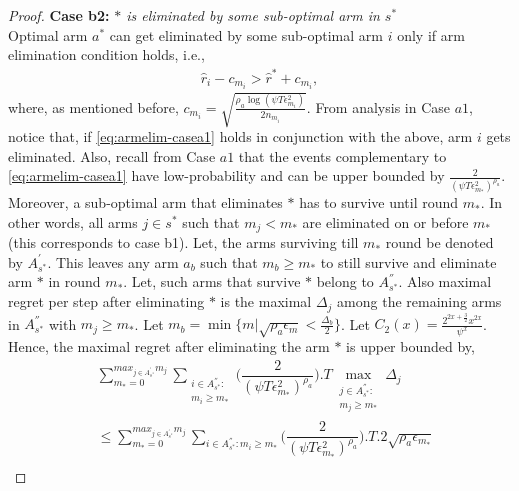 \begin{proof}
\textbf{Case b2:} \textit{${*}$ is eliminated by some sub-optimal arm in $s^*$} \\
Optimal arm $a^*$ can get eliminated by some sub-optimal arm $i$ only if arm elimination condition holds, i.e., 
\begin{align*}
\hat r_{i} - c_{m_{i}} > \hat{r}^{*}+ c_{m_{i}},
\end{align*}
where, as mentioned before, $c_{m_{i}}=\sqrt{\frac{\rho_{a}\log (\psi T\epsilon_{m_{i}}^{2})}{2 n_{m_{i}}}}$.
From analysis in Case $a1$, notice that, if \eqref{eq:armelim-casea1} holds in conjunction with the above, arm $i$ gets eliminated. Also, recall from Case $a1$ that the events complementary to \eqref{eq:armelim-casea1} have low-probability and can be upper bounded by $\frac{2}{(\psi  T\epsilon_{m_{*}}^{2})^{\rho_{a}}}$. Moreover, a sub-optimal arm that eliminates $*$ has to survive until round $m_*$. In other words, 
all arms ${j}\in s^{*}$ such that $m_{j} < m_{*}$ are eliminated on or before $m_*$ (this corresponds to case b1). 
Let, the arms surviving till $m_{*}$ round be denoted by $A^{'}_{s^{*}}$. This leaves any arm $a_{b}$ such that $m_{b}\geq m_{*} $ to still survive and eliminate arm ${*}$ in round $m_{*}$. Let, such arms that survive ${*}$ belong to $A^{''}_{s^{*}}$. Also maximal regret per step after eliminating ${*}$ is the maximal $\Delta_{j}$ among the remaining arms in $A^{''}_{s^{*}}$ with $m_{j}\geq m_{*}$.  Let $m_{b}=\min\lbrace m|\sqrt{\rho_{a}\epsilon_{m}}<\frac{\Delta_{b}}{2}\rbrace$. Let $C_2(x) = \frac{2^{2x+\frac{3}{2}}x^{2x}}{\psi^{x}}$. Hence, the maximal regret after eliminating the arm ${*}$ is upper bounded by, 
\begin{align*}
&\sum_{m_{*}=0}^{max_{j\in A^{'}_{s^{*}}}m_{j}}\sum_{\substack{i\in A^{''}_{s^{*}}: \\ m_{i}\geq m_{*}}}\bigg(\dfrac{2}{(\psi  T\epsilon_{m_{*}}^{2})^{\rho_{a}}} \bigg).T\max_{\substack{j\in A^{''}_{s^{*}}: \\ m_{j}\geq m_{*}}}{\Delta}_{j}\\
&\leq\sum_{m_{*}=0}^{max_{j\in A^{'}_{s^{*}}}m_{j}}\sum_{i\in A^{''}_{s^{*}}:m_{i} \geq m_{*}}\bigg(\dfrac{2}{(\psi  T\epsilon_{m_{*}}^{2})^{\rho_{a}}} \bigg).T.2\sqrt{\rho_{a}\epsilon_{m_{*}}} \\

\end{align*}
\end{proof}
